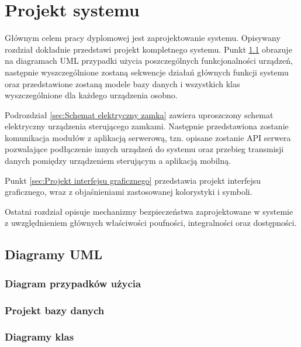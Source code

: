 % 
\newpage\section{Projekt systemu \textsl{\NazwaSys}}\label{sec:projekt}
Głównym celem pracy dyplomowej jest zaprojektowanie systemu. Opisywany rozdział dokładnie przedstawi projekt kompletnego systemu. Punkt \ref{sec:Diagramy UML} obrazuje na diagramach UML przypadki użycia poszczególnych funkcjonalności urządzeń, następnie wyszczególnione zostaną sekwencje działań głównych funkcji systemu oraz przedstawione zostaną modele bazy danych i wszystkich klas wyszczególnione dla każdego urządzenia osobno. 

Podrozdział \ref{sec:Schemat elektryczny zamka} zawiera uproszczony schemat elektryczny urządzenia sterującego zamkami. Następnie przedstawiona zostanie komunikacja modułów z aplikacją serwerową, tzn. opisane zostanie API serwera pozwalające podłączenie innych urządzeń do systemu oraz przebieg transmisji danych pomiędzy urządzeniem sterującym a aplikacją mobilną.

Punkt \ref{sec:Projekt interfejsu graficznego} przedstawia projekt interfejsu graficznego, wraz z objaśnieniami zastosowanej kolorystyki i symboli.

Ostatni rozdział opisuje mechanizmy bezpieczeństwa zaprojektowane w systemie z uwzględnieniem głównych właściwości poufności, integralności oraz dostępności.

\subsection{Diagramy UML}\label{sec:Diagramy UML}
	\subsubsection{Diagram przypadków użycia}
	
	\subsubsection{Projekt bazy danych} 
	
	\subsubsection{Diagramy klas} 
	
